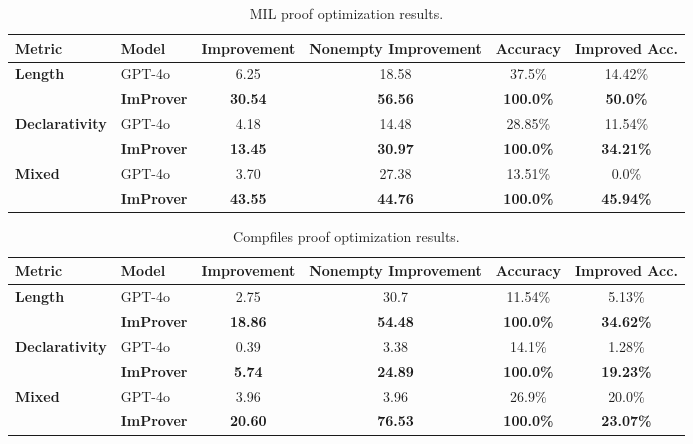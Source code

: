 \begin{table}[t]
\caption{MIL proof optimization results.}
\label{tab:main-mil}
\centering
\small
\begin{tabular}{ll|cccc}
\toprule
Metric & Model & Improvement & Nonempty Improvement & Accuracy & Improved Acc.\\
\midrule
\multirow{2}{*}{\textbf{Length}} & GPT-4o & 6.25 & 18.58 & 37.5\% & 14.42\% \\
 & \textbf{ImProver} & \textbf{30.54} & \textbf{56.56} & \textbf{100.0\%} & \textbf{50.0\%} \\
\midrule
\multirow{2}{*}{\textbf{Declarativity}} & GPT-4o & 4.18 & 14.48 & 28.85\% & 11.54\% \\
 & \textbf{ImProver} & \textbf{13.45} & \textbf{30.97} & \textbf{100.0\%} & \textbf{34.21\%} \\
\midrule
\multirow{2}{*}{\textbf{Mixed}} & GPT-4o & 3.70 & 27.38 & 13.51\% & 0.0\% \\
 & \textbf{ImProver} & \textbf{43.55} & \textbf{44.76} & \textbf{100.0\%} & \textbf{45.94\%} \\
\bottomrule
\end{tabular}
\end{table}

\begin{table}[t]
\caption{Compfiles proof optimization results.}
\label{tab:main-compfiles}
\centering
\small
\begin{tabular}{ll|cccc}
\toprule
Metric & Model & Improvement & Nonempty Improvement & Accuracy & Improved Acc.\\
\midrule
\multirow{2}{*}{\textbf{Length}} & GPT-4o & 2.75 & 30.7 & 11.54\% & 5.13\% \\
 & \textbf{ImProver} & \textbf{18.86} & \textbf{54.48} & \textbf{100.0\%} & \textbf{34.62\%} \\
\midrule
\multirow{2}{*}{\textbf{Declarativity}} & GPT-4o & 0.39 & 3.38 & 14.1\% & 1.28\% \\
 & \textbf{ImProver} & \textbf{5.74} & \textbf{24.89} & \textbf{100.0\%} & \textbf{19.23\%} \\
\midrule
\multirow{2}{*}{\textbf{Mixed}} & GPT-4o & 3.96 & 3.96 & 26.9\% & 20.0\% \\
 & \textbf{ImProver} & \textbf{20.60} & \textbf{76.53} & \textbf{100.0\%} & \textbf{23.07\%} \\
\bottomrule
\end{tabular}
\end{table}


